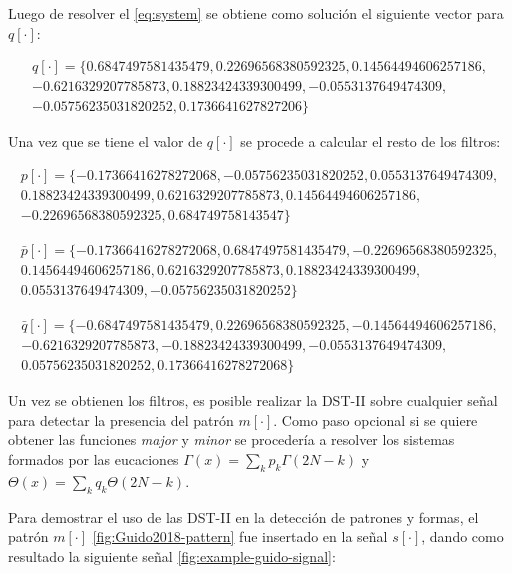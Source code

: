 Luego de resolver el \ref{eq:system} se obtiene como solución el siguiente vector para $q[\cdot]$:

$$
	\begin{array}{lcl}
		q[\cdot] = \{ 0.6847497581435479, 0.22696568380592325, 0.14564494606257186,  \\ 
					-0.6216329207785873, 0.18823424339300499, -0.0553137649474309, \\ 
					-0.05756235031820252, 0.1736641627827206 \}
	\end{array}
$$

Una vez que se tiene el valor de $q[\cdot]$ se procede a calcular el resto de los filtros:

$$
	\begin{array}{lcl}
		p[\cdot] = \{  -0.17366416278272068, -0.05756235031820252, 0.0553137649474309, \\ 
					0.18823424339300499, 0.6216329207785873, 0.14564494606257186, \\
					-0.22696568380592325, 0.684749758143547\}
	\end{array}
$$

$$
	\begin{array}{lcl}
		\bar p[\cdot] = \{ -0.17366416278272068, 0.6847497581435479, -0.22696568380592325, \\ 
							0.14564494606257186, 0.6216329207785873, 0.18823424339300499, \\ 
							0.0553137649474309, -0.05756235031820252 \}
	\end{array}
$$

$$
	\begin{array}{lcl}
		\bar q[\cdot] = \{ -0.6847497581435479, 0.22696568380592325, -0.14564494606257186,\\
			-0.6216329207785873, -0.18823424339300499, -0.0553137649474309, \\ 
		0.05756235031820252, 0.17366416278272068 \}
	\end{array}
$$

Un vez se obtienen los filtros, es posible realizar la DST-II sobre cualquier señal para detectar la presencia
del patrón $m[\cdot]$. Como paso opcional si se quiere obtener las funciones \textit{major} y \textit{minor}
se procedería a resolver los sistemas formados por las eucaciones  $\Gamma(x)=\sum_k p_k \Gamma(2N-k)$ y 
$\Theta(x)=\sum_k q_k \Theta(2N-k)$.

Para demostrar el uso de las DST-II en la detección de patrones y formas, el patrón $m[\cdot]$ \ref{fig:Guido2018-pattern} fue
insertado en la señal $s[\cdot]$, dando como resultado la siguiente señal \ref{fig:example-guido-signal}:

